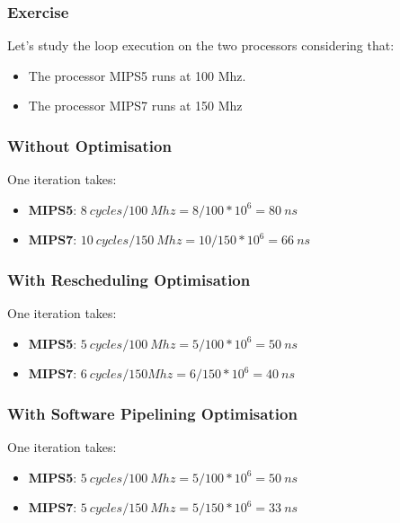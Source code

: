 
\begin{frame}
  \frametitle{Exercise}

  Let's study the loop execution on the two processors considering that:

  \begin{itemize}
    \item
      The processor MIPS5 runs at 100 Mhz.
    \item
      The processor MIPS7 runs at 150 Mhz
  \end{itemize}
\end{frame}


\begin{frame}
  \frametitle{Without Optimisation}

  One iteration takes:

  \begin{itemize}[<+->]
    \item
      \textbf{MIPS5}: $8~cycles / 100~Mhz = 8 / 100 * 10^{6} = 80~ns$
    \item
      \textbf{MIPS7}: $10~cycles / 150~Mhz = 10 / 150 * 10^{6} = 66~ns$
  \end{itemize}
\end{frame}


\begin{frame}
  \frametitle{With Rescheduling Optimisation}

  One iteration takes:

  \begin{itemize}[<+->]
    \item
      \textbf{MIPS5}: $5~cycles / 100~Mhz = 5 / 100 * 10^{6} = 50~ns$
    \item
      \textbf{MIPS7}: $6~cycles / 150 Mhz = 6 / 150 * 10^{6} = 40~ns$
  \end{itemize}
\end{frame}


\begin{frame}
  \frametitle{With Software Pipelining Optimisation}

  One iteration takes:

  \begin{itemize}[<+->]
    \item
      \textbf{MIPS5}: $5~cycles / 100~Mhz = 5 / 100 * 10^{6} = 50~ns$
    \item
      \textbf{MIPS7}: $5~cycles / 150~Mhz = 5 / 150 * 10^{6} = 33~ns$
  \end{itemize}
\end{frame}

